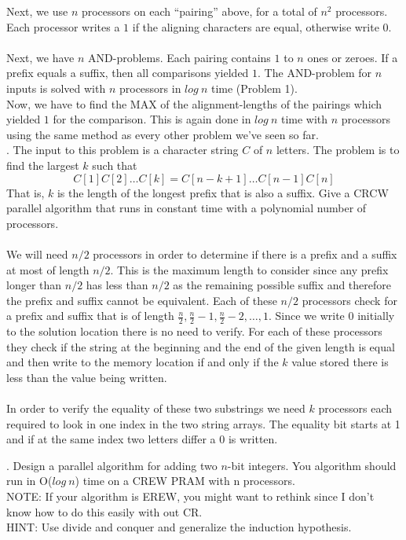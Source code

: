 \documentclass[10pt]{article}
\begin{document}
Next, we use $n$ processors on each ``pairing'' above, for a total of $n^2$ processors. Each processor writes
a $1$ if the aligning characters are equal, otherwise write $0$.\\
\\
Next, we have $n$ AND-problems. Each pairing contains $1$ to $n$ ones or zeroes. If a prefix equals a suffix,
then all comparisons yielded $1$. The AND-problem for $n$ inputs is solved with $n$ processors in $log~n$ time (Problem 1).
\\
Now, we have to find the MAX of the alignment-lengths of the pairings which yielded $1$ for the comparison. This is again
done in $log~n$ time with $n$ processors using the same method as every other problem we've seen so far.\\


. The input to this problem is a character string $C$ of $n$ letters. The problem is to find the largest $k$
such that
\[C[1]C[2] \ldots C[k] = C[n - k + 1] \ldots C[n - 1]C[n]\]
That is, $k$ is the length of the longest prefix that is also a suffix. Give a CRCW parallel algorithm that
runs in constant time with a polynomial number of processors.\\
\\
We will need $n/2$ processors in order to determine if there is a prefix and a suffix at most of length $n/2$.
This is the maximum length to consider since any prefix longer than $n/2$ has less than $n/2$ as the remaining 
possible suffix and therefore the prefix and suffix cannot be equivalent. Each of these $n/2$ processors check
for a prefix and suffix that is of length $\frac{n}{2}, \frac{n}{2} - 1, \frac{n}{2} - 2, \ldots, 1$. Since we write
0 initially to the solution location there is no need to verify. For each of these processors they check if the string 
at the beginning and the end of the given length is equal and then write to the memory location if and only if the $k$
value stored there is less than the value being written.\\
\\
In order to verify the equality of these two substrings we need $k$ processors each required to look in one index in the two
string arrays. The equality bit starts at 1 and if at the same index two letters differ a 0 is written. 

. Design a parallel algorithm for adding two $n$-bit integers. You algorithm should run in O($log~n$) time
on a CREW PRAM with n processors.\\
NOTE: If your algorithm is EREW, you might want to rethink since I don't know how to do this easily
with out CR.\\
HINT: Use divide and conquer and generalize the induction hypothesis.
\end{document}
